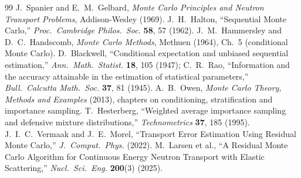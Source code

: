 \documentclass[11pt]{article}
\begin{document}
\begin{thebibliography}{99}
 J.~Spanier and E.~M.~Gelbard, \emph{Monte Carlo Principles and
  Neutron Transport Problems}, Addison-Wesley (1969).
 J.~H.~Halton, ``Sequential Monte Carlo,'' \emph{Proc.\ Cambridge
  Philos.\ Soc.} \textbf{58}, 57 (1962).
 J.~M.~Hammersley and D.~C.~Handscomb, \emph{Monte Carlo
  Methods}, Methuen (1964), Ch.~5 (conditional Monte Carlo).
 D.~Blackwell, ``Conditional expectation and unbiased sequential
  estimation,'' \emph{Ann.\ Math.\ Statist.} \textbf{18}, 105 (1947); C.~R.~Rao,
  ``Information and the accuracy attainable in the estimation of statistical
  parameters,'' \emph{Bull.\ Calcutta Math.\ Soc.} \textbf{37}, 81 (1945).
 A.~B.~Owen, \emph{Monte Carlo Theory, Methods and Examples} (2013),
  chapters on conditioning, stratification and importance sampling.
 T.~Hesterberg, ``Weighted average importance sampling and
  defensive mixture distributions,'' \emph{Technometrics} \textbf{37}, 185 (1995).
 J.~I.~C.~Vermaak and J.~E.~Morel, ``Transport Error Estimation Using
  Residual Monte Carlo,'' \emph{J.\ Comput.\ Phys.} (2022).
 M.~Larsen et al., ``A Residual Monte Carlo Algorithm for Continuous
  Energy Neutron Transport with Elastic Scattering,'' \emph{Nucl.\ Sci.\ Eng.}
  \textbf{200}(3) (2025).
\end{thebibliography}
\end{document}

